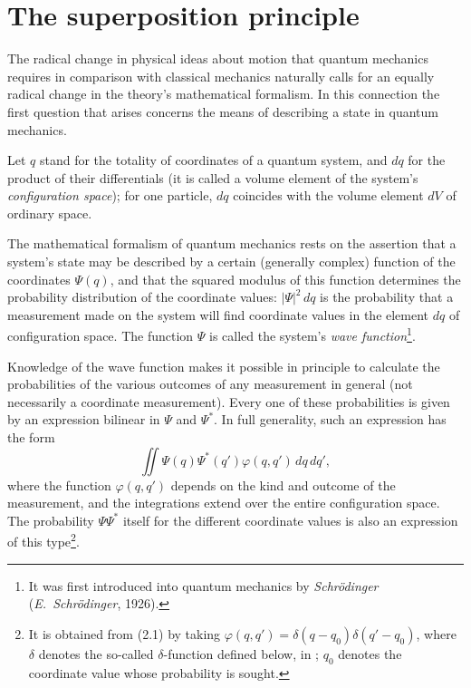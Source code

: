 \section{The superposition principle}

The radical change in physical ideas about motion that quantum mechanics
requires in comparison with classical mechanics naturally calls for an equally
radical change in the theory's mathematical formalism. In this connection the
first question that arises concerns the means of describing a state in quantum
mechanics.

Let $q$ stand for the totality of coordinates of a quantum
system, and $dq$ for the product of their differentials (it
is called a volume element of the system's \textit{configuration space}); for
one particle, $dq$ coincides with the volume element $dV$ of ordinary space.

The mathematical formalism of quantum mechanics rests on the assertion that a
system's state may be described by a certain (generally complex) function of
the coordinates $\Psi(q)$, and that the squared modulus of this function
determines the probability distribution of the coordinate values:
$|\Psi|^2\,dq$ is%
the probability that a measurement made on the system will find coordinate
values in the element $dq$ of configuration space. The function $\Psi$ is
called the system's \textit{wave function}\footnote{It was first introduced
into quantum mechanics by \textit{Schrödinger} (\textit{E.~Schrödinger},
1926).}.

Knowledge of the wave function makes it possible in principle to calculate
the probabilities of the various outcomes of any measurement in general (not
necessarily a coordinate measurement). Every one of these probabilities is
given by an expression bilinear in $\Psi$ and $\Psi^*$. In full generality,
such an expression has the form
\begin{equation}
  \iint \Psi(q)\Psi^*(q')\varphi(q,q')\,dq\,dq',
  \tag{2.1}
\end{equation}
where the function $\varphi(q,q')$ depends on the kind and outcome of the
measurement, and the integrations extend over the entire configuration space.
The probability $\Psi\Psi^*$ itself for the different coordinate values is
also an expression of this type\footnote{It is obtained from (2.1) by taking
$\varphi(q,q')=\delta(q-q_0)\delta(q'-q_0)$, where $\delta$ denotes the
so-called $\delta$-function defined below, in ; $q_0$ denotes the
coordinate value whose probability is sought.}.

